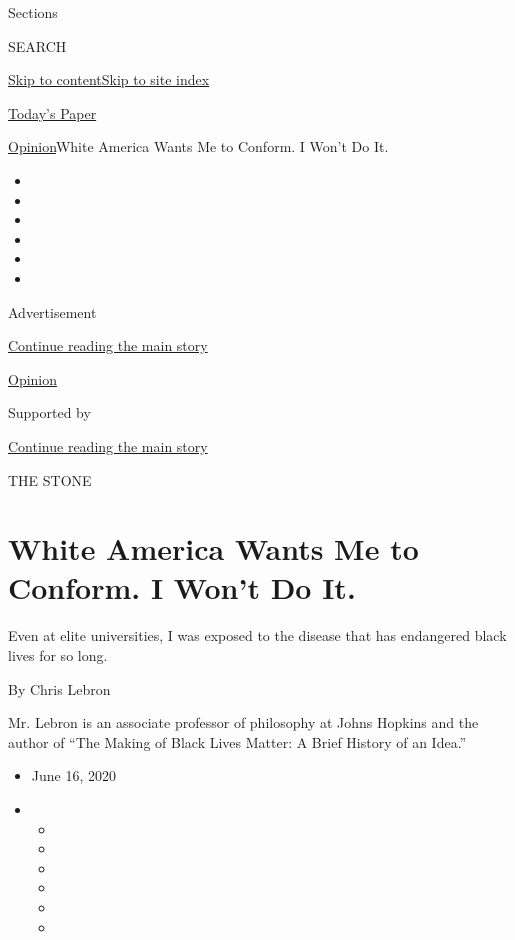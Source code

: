 Sections

SEARCH

\protect\hyperlink{site-content}{Skip to
content}\protect\hyperlink{site-index}{Skip to site index}

\href{https://myaccount.nytimes.com/auth/login?response_type=cookie\&client_id=vi}{}

\href{https://www.nytimes.com/section/todayspaper}{Today's Paper}

\href{/section/opinion}{Opinion}\textbar{}White America Wants Me to
Conform. I Won't Do It.

\begin{itemize}
\item
\item
\item
\item
\item
\item
\end{itemize}

Advertisement

\protect\hyperlink{after-top}{Continue reading the main story}

\href{/section/opinion}{Opinion}

Supported by

\protect\hyperlink{after-sponsor}{Continue reading the main story}

THE STONE

\hypertarget{white-america-wants-me-to-conform-i-wont-do-it}{%
\section{White America Wants Me to Conform. I Won't Do
It.}\label{white-america-wants-me-to-conform-i-wont-do-it}}

Even at elite universities, I was exposed to the disease that has
endangered black lives for so long.

By Chris Lebron

Mr. Lebron is an associate professor of philosophy at Johns Hopkins and
the author of ``The Making of Black Lives Matter: A Brief History of an
Idea.''

\begin{itemize}
\item
  June 16, 2020
\item
  \begin{itemize}
  \item
  \item
  \item
  \item
  \item
  \item
  \end{itemize}
\end{itemize}

